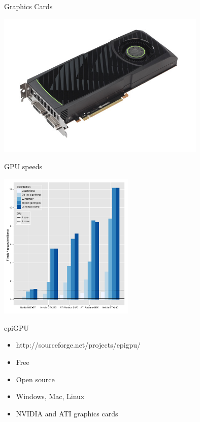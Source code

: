 \documentclass{beamer}
\begin{document}
\begin{frame}{Graphics Cards}
\begin{center}
\includegraphics[width=10cm]{gtx580}
\end{center}
\end{frame}



\begin{frame}{GPU speeds}
\begin{center}
\includegraphics[height=7cm]{gpuoptimisation.pdf}
\end{center}
\end{frame}

\begin{frame}{epiGPU}
\begin{itemize}
\item http://sourceforge.net/projects/epigpu/
\item Free
\item Open source
\item Windows, Mac, Linux
\item NVIDIA and ATI graphics cards
\end{itemize}
\end{frame}
\end{document}
